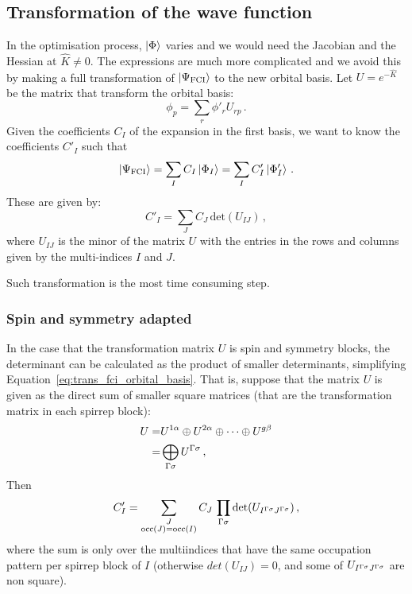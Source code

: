 \subsection{Transformation of the wave function}
In the optimisation process, $\ket{\Phi}$ varies and we would need the Jacobian and the Hessian at $\hat{K} \ne 0$.
The expressions are much more complicated and we avoid this by making a full transformation of $\ket{\Psi_\text{FCI}}$ to the new orbital basis.
Let $U = e^{-\hat{K}}$ be the matrix that transform the orbital basis:
\begin{equation}
  \phi_p = \sum_r \phi'_r U_{rp}\,.
\end{equation}
Given the coefficients $C_I$ of the expansion in the first basis, we want to know the coefficients $C'_I$ such that
\begin{equation}
  \ket{\Psi_\text{FCI}} = \sum_I C_I \ket{\Phi_I} = \sum_I C'_I \ket{\Phi'_I}\,.
\end{equation}
These are given by:
\begin{equation}\label{eq:trans_fci_orbital_basis}
  C'_I = \sum_J C_J\, \text{det}(U_{IJ})\,,
\end{equation}
where $U_{IJ}$ is the minor of the matrix $U$ with the entries in the rows and columns given by the multi-indices $I$ and $J$.

Such transformation is the most time consuming step.

\subsubsection{Spin and symmetry adapted}

In the case that the transformation matrix $U$ is spin and symmetry blocks, the determinant can be calculated as the product of smaller determinants, simplifying Equation~\eqref{eq:trans_fci_orbital_basis}.
That is, suppose that the matrix $U$ is given as the direct sum of smaller square matrices (that are the transformation matrix in each spirrep block):
\begin{equation}
  \begin{split}
    U =& U^{1\alpha} \oplus U^{2\alpha} \oplus \dots \oplus U^{g\beta}\\
    =& \bigoplus_{\Gamma \sigma} U^{\Gamma\sigma}\,,
  \end{split}
\end{equation}
Then 
\begin{equation}\label{eq:trans_fci_orbital_basis_sym}
  C'_I = \sum_{\substack{J\\\text{occ}(J) = \text{occ}(I)}}
  C_J\, \prod_{\Gamma\sigma} \text{det}(U_{I^{\Gamma\sigma}J^{\Gamma\sigma}})\,,
\end{equation}
where the sum is only over the multiindices that have the same occupation pattern per spirrep block of $I$ (otherwise $det(U_{IJ}) = 0$, and some of $U_{I^{\Gamma\sigma}J^{\Gamma\sigma}}$ are non square).

